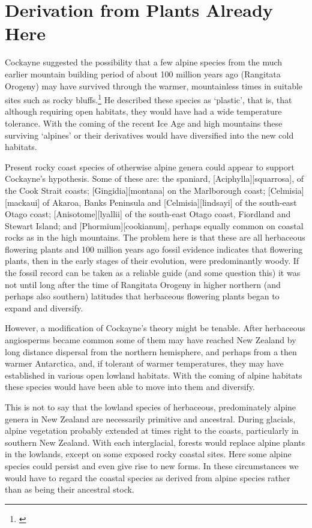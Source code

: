 \section{Derivation from Plants Already Here}

Cockayne suggested the possibility that a few alpine species from the much earlier mountain building period of about 100 million years ago (Rangitata Orogeny) may have survived through the warmer, mountainless times in suitable sites such as rocky bluffs.\footnote{\cite{cockayne1928vegetation}}
He described these species as `plastic', that is, that although requiring open habitats, they would have had a wide temperature tolerance.
With the coming of the recent Ice Age and high mountains these surviving `alpines' or their derivatives would have diversified into the new cold habitats.

Present rocky coast species of otherwise alpine genera could appear to support Cockayne's hypothesis.
Some of these are: the spaniard, [Aciphylla][squarrosa], of the Cook Strait coasts; [Gingidia][montana] on the Marlborough coast; [Celmisia][mackaui] of Akaroa, Banks Peninsula and [Celmisia][lindsayi] of the south-east Otago coast; [Anisotome][lyallii] of the south-east Otago coast, Fiordland and Stewart Island; and [Phormium][cookianum], perhaps equally common on coastal rocks as in the high mountains.
The problem here is that these are all herbaceous flowering plants and 100 million years ago fossil evidence indicates that flowering plants, then in the early stages of their evolution, were predominantly woody.
If the fossil record can be taken as a reliable guide (and some question this) it was not until long after the time of Rangitata Orogeny in higher northern (and perhaps also southern) latitudes that herbaceous flowering plants began to expand and diversify.

However, a modification of Cockayne's theory might be tenable.
After herbaceous angiosperms became common some of them may have reached New Zealand by long distance dispersal from the northern hemisphere, and perhaps from a then warmer Antarctica, and, if tolerant of warmer temperatures, they may have established in various open lowland habitats.
With the coming of alpine habitats these species would have been able to move into them and diversify.

This is not to say that the lowland species of herbaceous, predominately alpine genera in New Zealand are necessarily primitive and ancestral.
During glacials, alpine vegetation probably extended at times right to the coasts, particularly in southern New Zealand.
With each interglacial, forests would replace alpine plants in the lowlands, except on some exposed rocky coastal sites.
Here some alpine species could persist and even give rise to new forms.
In these circumstances we would have to regard the coastal species as derived from alpine species rather than as being their ancestral stock.

